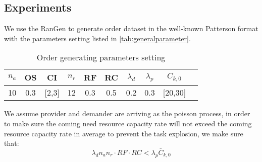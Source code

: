 
%     
%     
%     
%     
%     


\subsection{Experiments} %
\label{ssub:case_design}
We use the RanGen\cite{Demeulemeester2003} to generate order dataset in the well-known Patterson format with the parameters setting listed in \autoref{tab:generalparameter}. 
\begin{table}[htbp]
  \centering
  \scriptsize
  \caption{Order generating parameters setting}
    \begin{tabular}{cccccccccc}
    \toprule
    \textbf{$n_a$} & \textbf{OS} & \textbf{CI} & \textbf{$n_r$} & \textbf{RF} & \textbf{RC} & \textbf{$\lambda_d$} &\textbf{$\lambda_p$} & \textbf{$C_{k,0}$}\\
    \midrule
     10  &   0.3    &  [2,3]     &   12     &  0.3     &   0.5  & 0.2 & 0.3  & [20,30] \\
    \bottomrule
    \end{tabular}%
    {
    }
  \label{tab:generalparameter}%
\end{table}%
We assume provider and demander are arriving as the poisson process, in order to make sure the coming need resource capacity rate will not exceed the coming resource capacity rate in average to prevent the task explosion, we make sure that:
\begin{equation}
\lambda_d n_a n_r \cdot RF \cdot RC < \lambda_p \bar C_{k,0} \label{eq:balance}
\end{equation}

